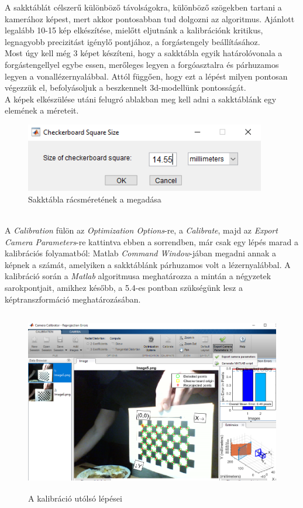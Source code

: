 \documentclass[12pt,a4paper]{article}
\begin{document}
A sakktáblát célszerű különböző távolságokra, különböző szögekben tartani a kamerához képest, mert akkor pontosabban tud dolgozni az algoritmus. Ajánlott legalább 10-15 kép elkészítése, mielőtt eljutnánk a kalibrációnk kritikus, legnagyobb precizitást igénylő pontjához, a forgástengely beállításához.\\[10pt]
Most úgy kell még 3 képet készíteni, hogy a sakktábla egyik határolóvonala a forgástengellyel egybe essen, merőleges legyen a forgóasztalra és párhuzamos legyen a vonallézernyalábbal. Attól függően, hogy ezt a lépést milyen pontosan végezzük el, befolyásoljuk a beszkennelt 3d-modellünk pontosságát.\\[10pt]
A képek elkészülése utáni felugró ablakban meg kell adni a sakktáblánk egy elemének a méreteit.\\[10pt]
\begin{figure}[h!]
	\centering
	\includegraphics[height=3cm]{images/cameraCalibrator_checkboardSize}
	\caption{Sakktábla rácsméretének a megadása}
\end{figure}\\[10pt]
A \textit{Calibration} fülön az \textit{Optimization Options}-re, a \textit{Calibrate}, majd az \textit{Export Camera Parameters}-re kattintva ebben a sorrendben, már csak egy lépés marad a kalibrációs folyamatból: Matlab \textit{Command Window}-jában megadni annak a képnek a számát, amelyiken a sakktáblánk párhuzamos volt a lézernyalábbal. A kalibráció során a \textit{Matlab} algoritmusa meghatározza a mintán a négyzetek sarokpontjait, amikhez később, a 5.4-es pontban szükségünk lesz a képtranszformáció meghatározásában.

\begin{figure}[h!]
	\centering
	\includegraphics[height=8cm]{images/cameraCalibrator_exportCameraParams}
	\caption{A kalibráció utólsó lépései}
\end{figure}
\end{document}
